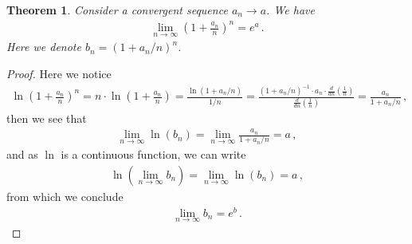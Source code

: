 \documentclass[11pt,oneside]{book}
\theoremstyle{newStyle}
\newtheorem{thm}{Theorem}[chapter]
\begin{document}
\begin{thm}
Consider a convergent sequence $a_n \to a$. We have
\begin{align*}
\lim_{n\to \infty}\left( 1+ \frac{a_n}{n}\right)^n  = e^a\,.
\end{align*}
Here we denote $b_n = (1+a_n/n)^n$. 
\end{thm}
\begin{proof}
Here we notice
\begin{align*}
\ln\left( 1+ \frac{a_n}{n}\right)^n = n\cdot \ln \left( 1+ \frac{a_n}{n}\right) = \frac{\ln(1+a_n/n)}{1/n} = \frac{(1+a_n/n)^{-1} \cdot a_n \cdot \frac{d}{dn}\left( \frac{1}{n}\right)}{\frac{d}{dn}\left(\frac{1}{n}\right)} = \frac{a_n}{1+a_n/n}\,,
\end{align*}
then we see that 
\begin{align*}
\lim_{n\to \infty}\ln(b_n) = \lim_{n\to \infty} \frac{a_n}{1+a_n/n} = a\,,
\end{align*}
and as $\ln$ is a continuous function, we can write
\begin{align*}
\ln\left( \lim_{n\to \infty}b_n\right) = \lim_{n\to \infty}\ln(b_n) = a\,,
\end{align*}
from which we conclude 
\begin{align*}
\lim_{n\to \infty} b_n = e^b\,.
\end{align*}
\end{proof}
\end{document}
